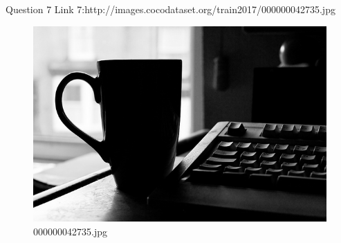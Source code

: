 Question 7
Link 7:http://images.cocodataset.org/train2017/000000042735.jpg
    \begin{figure}[h]
        \centering
        \includegraphics[width=0.8\linewidth]{../image set/easy/000000042735.jpg}
        \caption{000000042735.jpg}
    \end{figure}
